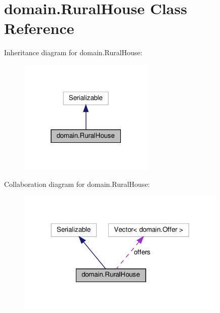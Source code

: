 \hypertarget{classdomain_1_1_rural_house}{}\section{domain.\+Rural\+House Class Reference}
\label{classdomain_1_1_rural_house}


Inheritance diagram for domain.\+Rural\+House\+:
\nopagebreak
\begin{figure}[H]
\begin{center}
\leavevmode
\includegraphics[width=183pt]{classdomain_1_1_rural_house__inherit__graph}
\end{center}
\end{figure}


Collaboration diagram for domain.\+Rural\+House\+:
\nopagebreak
\begin{figure}[H]
\begin{center}
\leavevmode
\includegraphics[width=284pt]{classdomain_1_1_rural_house__coll__graph}
\end{center}
\end{figure}
